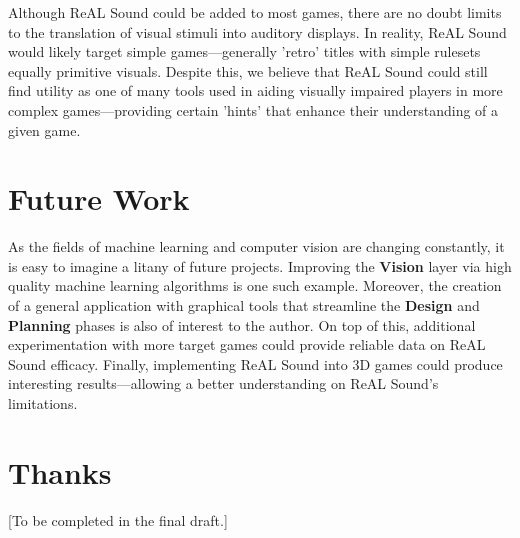 \documentclass{report}
\newcommand{\rs}{ReAL Sound\xspace}
\newcommand{\plan}{\textbf{Planning}\xspace}
\newcommand{\design}{\textbf{Design}\xspace}
\newcommand{\vision}{\textbf{Vision}\xspace}
\begin{document}
Although \rs could be added to most games, there are no doubt limits to the translation of visual stimuli into auditory displays. In reality, \rs would likely target simple games---generally 'retro' titles with simple rulesets equally primitive visuals. Despite this, we believe that \rs could still find utility as one of many tools used in aiding visually impaired players in more complex games---providing certain 'hints' that enhance their understanding of a given game. 

\section{Future Work}
As the fields of machine learning and computer vision are changing constantly, it is easy to imagine a litany of future projects. Improving the \vision layer via high quality machine learning algorithms is one such example. Moreover, the creation of a general application with graphical tools that streamline the \design and \plan phases is also of interest to the author. On top of this, additional experimentation with more target games could provide reliable data on \rs efficacy. Finally, implementing \rs into 3D games could produce interesting results---allowing a better understanding on \rs's limitations.

\section{Thanks}
[To be completed in the final draft.]

% 
\printbibliography
\end{document}
